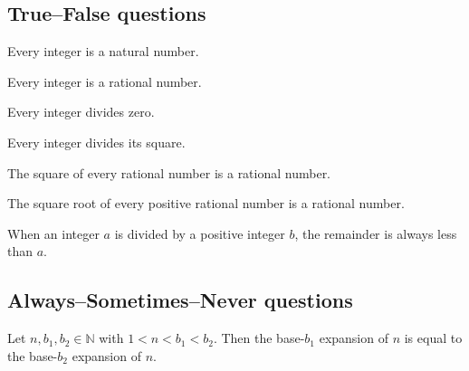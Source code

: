 \subsection*{True--False questions}


\begin{chapex} %
\label{cqGettingStartedTFBegin}
Every integer is a natural number.
\end{chapex}

\begin{chapex} %
Every integer is a rational number.
\end{chapex}

\begin{chapex} %
Every integer divides zero.
\end{chapex}

\begin{chapex} %
Every integer divides its square.
\end{chapex}

\begin{chapex} %
The square of every rational number is a rational number.
\end{chapex}

\begin{chapex} %
The square root of every positive rational number is a rational number.
\end{chapex}

\begin{chapex} %
\label{cqGettingStartedTFEnd}
When an integer $a$ is divided by a positive integer $b$, the remainder is always less than $a$.
\end{chapex}


\subsection*{Always--Sometimes--Never questions}


\begin{chapex} %
\label{cqGettingStartedASNBegin}
Let $n,b_1,b_2 \in \mathbb{N}$ with $1 < n < b_1 < b_2$. Then the base-$b_1$ expansion of $n$ is equal to the base-$b_2$ expansion of $n$.
\end{chapex}

